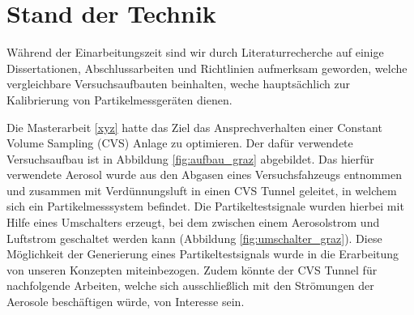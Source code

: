 \section{Stand der Technik}
W\"{a}hrend der Einarbeitungszeit sind wir durch Literaturrecherche auf einige Dissertationen, Abschlussarbeiten und Richtlinien aufmerksam geworden, welche vergleichbare Versuchsaufbauten beinhalten, weche haupts\"{a}chlich zur Kalibrierung von Partikelmessger\"{a}ten dienen.

Die Masterarbeit \ref{xyz} hatte das Ziel das Ansprechverhalten einer Constant Volume Sampling (CVS) Anlage zu optimieren. Der daf\"{u}r verwendete Versuchsaufbau ist in Abbildung \ref{fig:aufbau_graz} abgebildet. Das hierf\"{u}r verwendete Aerosol wurde aus den Abgasen eines Versuchsfahzeugs entnommen und zusammen mit Verd\"{u}nnungsluft in einen CVS Tunnel geleitet, in welchem sich ein Partikelmesssystem befindet. Die Partikeltestsignale wurden hierbei mit Hilfe eines Umschalters erzeugt, bei dem zwischen einem Aerosolstrom und Luftstrom geschaltet werden kann (Abbildung \ref{fig:umschalter_graz}). Diese M\"{o}glichkeit der Generierung eines Partikeltestsignals wurde in die Erarbeitung von unseren Konzepten miteinbezogen. Zudem k\"{o}nnte der CVS Tunnel f\"{u}r nachfolgende Arbeiten, welche sich ausschlie{\ss}lich mit den Str\"{o}mungen der Aerosole besch\"{a}ftigen w\"{u}rde, von Interesse sein.

